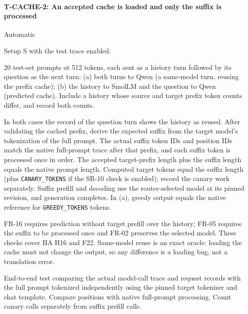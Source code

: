 \documentclass[12pt, titlepage]{article}
\newenvironment{testcase}[2]
  {\Needspace{8\baselineskip}\paragraph{#1: #2}\phantomsection\label{test:#1}\sloppy
   \begin{description}[style=sameline, leftmargin=3.6cm, labelwidth=3.4cm,
     font=\normalfont\bfseries, itemsep=2pt, topsep=2pt]}
  {\end{description}}
\newcommand{\cst}[1]{\texttt{#1}}
\begin{document}
\begin{testcase}{T-CACHE-2}{An accepted cache is loaded and only the suffix
is processed}
\item[Control] Automatic
\item[Initial state] Setup S with the test trace enabled.
\item[Input] 20 test-set prompts at 512 tokens, each sent as a history
turn followed by its question as the next turn: (a) both turns to Qwen
(a same-model turn, reusing the prefix cache); (b) the history to SmolLM and the question to Qwen
(predicted cache). Include a history whose source and target prefix token
counts differ, and record both counts.
\item[Output] In both cases the record of the question turn shows the
history as reused. After validating the cached prefix, derive the expected
suffix from the target model's tokenization of the full prompt. The actual
suffix token IDs and position IDs match the native full-prompt trace after
that prefix, and each suffix token is processed once in order. The accepted
target-prefix length plus the suffix length equals the native prompt length.
Computed target tokens equal the suffix length (plus \cst{CANARY\_TOKENS}
if the SR-10 check is enabled); record the canary work separately. Suffix
prefill and decoding use the router-selected model at its pinned revision,
and generation completes. In (a), greedy output equals the native reference
for \cst{GREEDY\_TOKENS} tokens.
\item[Derivation] FR-16 requires prediction without target prefill over
the history; FR-05 requires the suffix to be processed once and FR-02
preserves the selected model. These checks cover HA H16 and F22. Same-model
reuse is an exact oracle: loading the cache must not change the output, so
any difference is a loading bug, not a translation error.
\item[How performed] End-to-end test comparing the actual model-call trace
and request records with the full prompt tokenized independently using
the pinned target tokenizer and chat template. Compare positions with
native full-prompt processing. Count canary calls separately from suffix
prefill calls.
\end{testcase}
\end{document}

